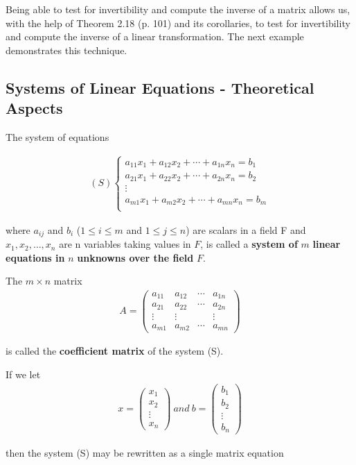 \documentclass{article}
\newcommand{\bd}[1]{\textbf{#1}}
\newcommand*\bpmat[0]{\begin{pmatrix}}
\newcommand*\epmat[0]{\end{pmatrix}}
\theoremstyle{plain}
\theoremstyle{plain} %
\begin{document}
Being able to test for invertibility and compute the inverse of a matrix allows us, with the help of Theorem 2.18 (p. 101) and its corollaries, to test for invertibility and compute the inverse of a linear transformation. The next example demonstrates this technique.

\subsection{Systems of Linear Equations - Theoretical Aspects}

The system of equations

\begin{align*}
  (S)
\begin{cases}
  a_{11}x_1+a_{12}x_2+\cdots+a_{1n}x_n=b_1\\
  a_{21}x_1+a_{22}x_2+\cdots+a_{2n}x_n=b_2\\
  \vdots\\
  a_{m1}x_1+a_{m2}x_2+\cdots+a_{mn}x_n=b_m\\
\end{cases}
\end{align*}

where $a_{ij}$ and $b_i$ ($1 \leq i \leq m$ and $1 \leq j \leq n$) are scalars in a field F and $x_1, x_2,\ldots,x_n$ are n variables taking values in $F$, is called a \bd{system of} $m$ \bd{linear equations in} $n$ \bd{unknowns over the field} $F$.

The $m \times n$ matrix
\begin{align*}
  A=\bpmat
  a_{11}&a_{12}&\cdots&a_{1n}\\
  a_{21}&a_{22}&\cdots&a_{2n}\\
  \vdots&\vdots&&\vdots\\
  a_{m1}&a_{m2}&\cdots&a_{mn}
  \epmat
\end{align*}

is called the \bd{coefficient matrix} of the system (S).

If we let
\begin{align*}
  x=\bpmat x_1\\x_2\\\vdots\\x_n\epmat~and~b=\bpmat b_1\\b_2\\\vdots\\b_n\epmat
\end{align*}

then the system (S) may be rewritten as a single matrix equation
\end{document}
